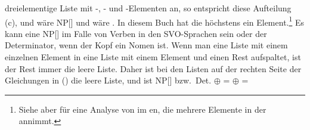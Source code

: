 dreielementige Liste mit -, - und -Elementen an, so entspricht diese Aufteilung (c), und  wäre NP[] und
 wäre . In diesem Buch hat die \sprl höchstens ein Element.\footnote{
  Siehe aber  für eine Analyse von  im en, die mehrere Elemente in
  der \sprl annimmt.
} Es kann eine NP[] im Falle von Verben in den SVO-Sprachen sein oder der Determinator, wenn
der Kopf ein Nomen ist. Wenn man eine Liste mit einem einzelnen Element in eine Liste mit einem Element
und einen Rest aufspaltet, ist der Rest immer die leere Liste. Daher ist  bei den Listen auf der rechten Seite der Gleichungen in () die
leere Liste, und  ist NP[] bzw.\ Det.
\eal
\ex \eliste{} $\oplus$  = 
\ex \eliste{} $\oplus$  = 
\zl

